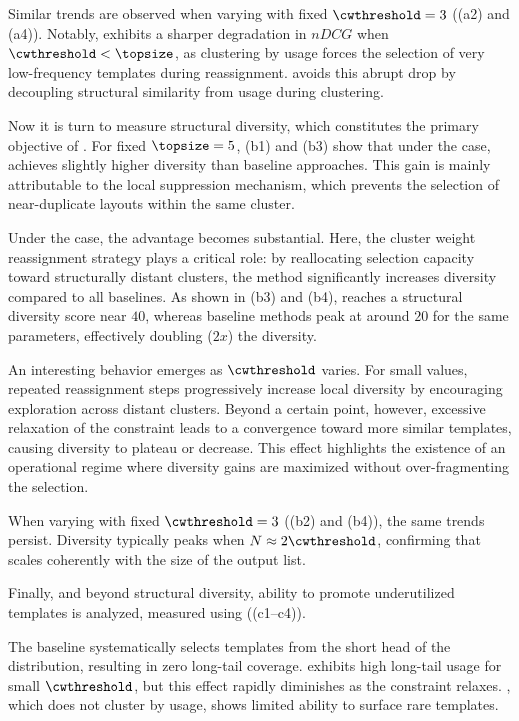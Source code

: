 Similar trends are observed when varying \topsize with fixed $\cwthreshold=3$ ((a2) and (a4)). Notably, \classicclusdiv exhibits a sharper degradation in $nDCG$ when $\cwthreshold < \topsize$, as clustering by usage forces the selection of very low-frequency templates during reassignment. \trs avoids this abrupt drop by decoupling structural similarity from usage during clustering.


Now it is turn to measure structural diversity, which constitutes the primary objective of \trs.
For fixed $\topsize=5$, (b1) and (b3) show that under the \ODD case, \trs achieves slightly higher diversity than baseline approaches. This gain is mainly attributable to the local suppression mechanism, which prevents the selection of near-duplicate layouts within the same cluster.

Under the \ISD case, the advantage becomes substantial. Here, the cluster weight reassignment strategy plays a critical role: by reallocating selection capacity toward structurally distant clusters, the method significantly increases diversity compared to all baselines. As shown in (b3) and (b4), \trs reaches a structural diversity score near $40$, whereas baseline methods peak at around $20$ for the same parameters, effectively doubling ($2x$) the diversity.

An interesting behavior emerges as $\cwthreshold$ varies. For small values, repeated reassignment steps progressively increase local diversity by encouraging exploration across distant clusters. Beyond a certain point, however, excessive relaxation of the constraint leads to a convergence toward more similar templates, causing diversity to plateau or decrease. This effect highlights the existence of an operational regime where diversity gains are maximized without over-fragmenting the selection.

When varying \topsize with fixed $\cwthreshold=3$ ((b2) and (b4)), the same trends persist. Diversity typically peaks when $N \approx 2\cwthreshold$, confirming that \trs scales coherently with the size of the output list.


Finally, and beyond structural diversity,  \trs ability to promote underutilized templates is analyzed, measured using \LTP ((c1--c4)).

The \mostpopular baseline systematically selects templates from the short head of the distribution, resulting in zero long-tail coverage. \classicclusdiv exhibits high long-tail usage for small $\cwthreshold$, but this effect rapidly diminishes as the constraint relaxes. \adaptedclusdiv, which does not cluster by usage, shows limited ability to surface rare templates.

